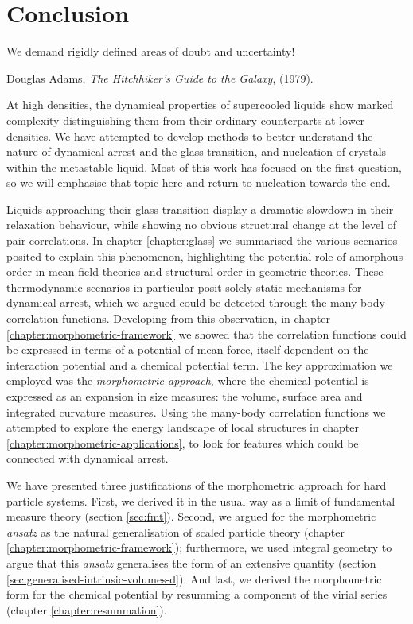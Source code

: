 \documentclass[11pt,twoside]{report}
\begin{document}
\chapter{Conclusion}
\epigraph{We demand rigidly defined areas of doubt and uncertainty!}{Douglas Adams, \emph{The Hitchhiker's Guide to the Galaxy}, (1979).}

At high densities, the dynamical properties of supercooled liquids show marked complexity distinguishing them from their ordinary counterparts at lower densities.
We have attempted to develop methods to better understand the nature of dynamical arrest and the glass transition, and nucleation of crystals within the metastable liquid.
Most of this work has focused on the first question, so we will emphasise that topic here and return to nucleation towards the end.


Liquids approaching their glass transition display a dramatic slowdown in their relaxation behaviour, while showing no obvious structural change at the level of pair correlations.
In chapter \ref{chapter:glass} we summarised the various scenarios posited to explain this phenomenon, highlighting the potential role of amorphous order in mean-field theories and structural order in geometric theories.
These thermodynamic scenarios in particular posit solely static mechanisms for dynamical arrest, which we argued could be detected through the many-body correlation functions.
Developing from this observation, in chapter \ref{chapter:morphometric-framework} we showed that the correlation functions could be expressed in terms of a potential of mean force, itself dependent on the interaction potential and a chemical potential term.
The key approximation we employed was the \emph{morphometric approach}, where the chemical potential is expressed as an expansion in size measures: the volume, surface area and integrated curvature measures.
Using the many-body correlation functions we attempted to explore the energy landscape of local structures in chapter \ref{chapter:morphometric-applications}, to look for features which could be connected with dynamical arrest.


We have presented three justifications of the morphometric approach for hard particle systems.
First, we derived it in the usual way as a limit of fundamental measure theory (section \ref{sec:fmt}).
Second, we argued for the morphometric \emph{ansatz} as the natural generalisation of scaled particle theory (chapter \ref{chapter:morphometric-framework}); furthermore, we used integral geometry to argue that this \emph{ansatz} generalises the form of an extensive quantity (section \ref{sec:generalised-intrinsic-volumes-d}).
And last, we derived the morphometric form for the chemical potential by resumming a component of the virial series (chapter \ref{chapter:resummation}).
\end{document}
